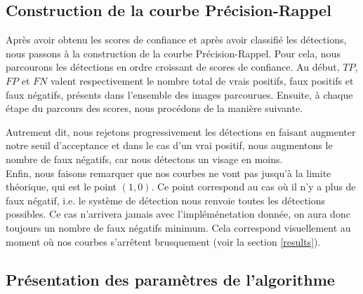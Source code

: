 \documentclass[a4paper,11pt]{article}
\begin{document}
    \subsection{Construction de la courbe Précision-Rappel}
    \label{construction_courbe}
        
        Après avoir obtenu les scores de confiance et après avoir classifié les détections, nous passons à la construction de la courbe Précision-Rappel.
        Pour cela, nous parcourons les détections en ordre croissant de scores de confiance.
        Au début, $TP$, $FP$ et $FN$ valent respectivement le nombre total de vrais positifs, faux positifs et faux négatifs, présents dans l'ensemble des images parcourues.
        Ensuite, à chaque étape du parcours des scores, nous procédons de la manière suivante.

        \begin{algorithm}[H]
        \end{algorithm}
        Autrement dit, nous rejetons progressivement les détections en faisant augmenter notre seuil d'acceptance et dans le cas d'un vrai positif, nous augmentons le nombre de faux négatifs, car nous détectons un visage en moins.
        \\
        Enfin, nous faisons remarquer que nos courbes ne vont pas jusqu'à la limite théorique, qui est le point $(1,0)$. 
        Ce point correspond au cas où il n'y a plus de faux négatif, i.e. le système de détection nous renvoie toutes les détections possibles.
        Ce cas n'arrivera jamais avec l'impléménetation donnée, on aura donc toujours un nombre de faux négatifs minimum.
        Cela correspond visuellement au moment où nos courbes s'arrêtent brusquement (voir la section \ref{results}).

    \subsection{Présentation des paramètres de l'algorithme}
        
\end{document}
